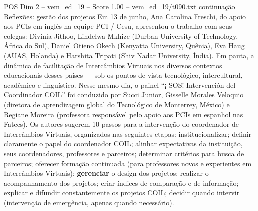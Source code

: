 \begin{textsample}{POS Dim 2 – vem\_ed\_19 – Score 1.00 – vem\_ed\_19/t090.txt}  \label{ex:f2_pos_024}
continuação Reflexões: gestão dos projetos Em 13 de junho, Ana Carolina Freschi, do apoio aos PCIs em inglês na equipe PCI / Cesu, apresentou o trabalho com seus colegas: Divinia Jithoo, Lindelwa Mkhize (Durban University of Technology, África do Sul), Daniel Otieno Okech (Kenyatta University, Quênia), Eva Haug (AUAS, Holanda) e Harshita Tripati (Shiv Nadar University, Índia).
Em pauta, a dinâmica de facilitação de Intercâmbios Virtuais nos diversos contextos educacionais desses países — sob os pontos de vista tecnológico, intercultural, acadêmico e linguístico.
Nesse mesmo dia, o painel “¡ SOS!
Intervención del Coordinador COIL” foi conduzido por Succi Junior, Gisselle Morales Veloquio (diretora de aprendizagem global do Tecnológico de Monterrey, México) e Regiane Moreira (professora responsável pelo apoio aos PCIs em espanhol nas Fatecs).
Os autores sugerem 10 passos para a intervenção do coordenador de Intercâmbios Virtuais, organizados nas seguintes etapas: institucionalizar; definir claramente o papel do coordenador COIL; alinhar expectativas da instituição, seus coordenadores, professores e parceiros; determinar critérios para busca de parceiros; oferecer formação continuada (para professores novos e experientes em Intercâmbios Virtuais); \textbf{gerenciar} o design dos projetos; realizar o acompanhamento dos projetos; criar índices de comparação e de informação; explicar e difundir constantemente os projetos COIL; decidir quando intervir (intervenção de emergência, apenas quando necessário).

\end{textsample}
